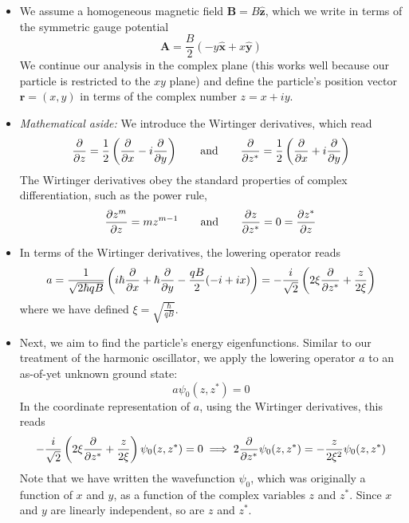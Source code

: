 \documentclass[11pt, a4paper]{article}
\newcommand{\eqtext}[1]{\qquad \text{#1} \qquad}
\renewcommand{\vec}[1]{\bm{#1}}  %
\newcommand{\uvec}[1]{\hat{\vec{#1}}}  %
\renewcommand{\r}{\vec{r}}  %
\newcommand{\A}{\vec{A}}  %
\newcommand{\B}{\vec{B}}  %
\newcommand{\p}{\psi}  %
\begin{document}
\begin{itemize}
	\item We assume a homogeneous magnetic field $ \B = B \uvec{z} $, which we write in terms of the symmetric gauge potential
	\begin{equation*}
		\A = \frac{B}{2}(-y\uvec{x} + x \uvec{y})
	\end{equation*}
	We continue our analysis in the complex plane (this works well because our particle is restricted to the $ xy $ plane) and define the particle's position vector $ \r = (x, y) $ in terms of the complex number $ z = x + i y $.
	
	\item \textit{Mathematical aside:} We introduce the Wirtinger derivatives, which read
	\begin{equation*}
		\pdv{z} = \frac{1}{2}\left(\pdv{x} - i\pdv{y}\right) \eqtext{and} \pdv{z^{*}} = \frac{1}{2}\left(\pdv{x} + i\pdv{y}\right)
	\end{equation*}
	The Wirtinger derivatives obey the standard properties of complex differentiation, such as the power rule,
	\begin{equation*}
		\pdv{z^{m}}{z} = mz^{m-1} \eqtext{and} \pdv{z}{z^{*}} = 0 = \pdv{z^{*}}{z}
	\end{equation*}
	
	\item In terms of the Wirtinger derivatives, the lowering operator reads 
	\begin{align*}
		a = \frac{1}{\sqrt{2\hbar q B}}\left(i \hbar \pdv{x} + \hbar \pdv{y} - \frac{qB}{2}(-i + ix)\right) = -\frac{i}{\sqrt{2}} \left(2 \xi \pdv{z^{*}} + \frac{z}{2\xi}\right)
	\end{align*}
	where we have defined $ \xi = \sqrt{\frac{\hbar}{qB}} $.
	
	\item Next, we aim to find the particle's energy eigenfunctions. Similar to our treatment of the harmonic oscillator, we apply the lowering operator $ a $ to an as-of-yet unknown ground state:
	\begin{equation*}
		a \p_{0}(z, z^{*}) = 0
	\end{equation*}
	In the coordinate representation of $ a $, using the Wirtinger derivatives, this reads
	\begin{equation*}
		-\frac{i}{\sqrt{2}} \left(2 \xi \pdv{z^{*}} + \frac{z}{2\xi}\right) \p_{0}(z, z^{*}) = 0 \implies 2 \pdv{}{z^{*}}\p_{0}(z, z^{*}) = - \frac{z}{2\xi^{2}}\p_{0}(z, z^{*})
	\end{equation*}
	Note that we have written the wavefunction $ \p_{0} $, which was originally a function of $ x $ and $ y $, as a function of the complex variables $ z $ and $ z^{*} $. Since $ x $ and $ y $ are linearly independent, so are $ z $ and $ z^{*} $. 
	

\end{itemize}
\end{document}
